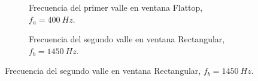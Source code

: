        \begin{figure}[H]
        \centering
        \begin{subfigure}[H]{0.48\textwidth}
          \caption{Frecuencia del primer valle en ventana Flattop, $f_{a}=400~Hz$.}
        \end{subfigure}
        \hfill
        \begin{subfigure}[H]{0.48\textwidth}
          \caption{Frecuencia del segundo valle en ventana Rectangular, $f_{b}=1450~Hz$.}
        \end{subfigure}

\end{figure}
